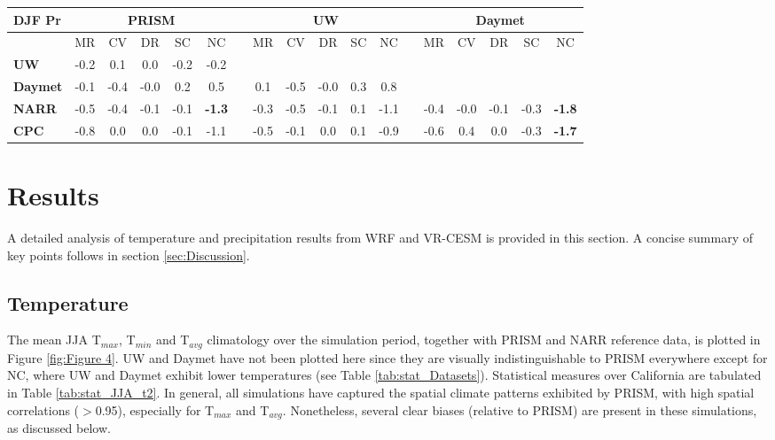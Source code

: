 \begin{table}
\begin{tabular}{lccccccccccccccccc}
\hline \hline \textbf{DJF Pr} & \multicolumn{5}{c}{\textbf{PRISM}} & & \multicolumn{5}{c}{\textbf{UW}} & & \multicolumn{5}{c}{\textbf{Daymet}} \\
\hline & MR &CV& DR& SC& NC & & MR& CV &DR &SC& NC & & MR &CV &DR &SC& NC \\
\hline \textbf{UW} & -0.2 & 0.1 & 0.0 & -0.2 & -0.2 \\
\textbf{Daymet} & -0.1 & -0.4 & -0.0 & 0.2 & 0.5 & & 0.1 & -0.5 & -0.0 & 0.3 & 0.8 \\
\textbf{NARR} & -0.5 & -0.4 & -0.1 & -0.1 &\textbf{\color{pinkred}-1.3} & & -0.3 & -0.5 & -0.1 & 0.1 & -1.1 & & -0.4 & -0.0 & -0.1 & -0.3 & \textbf{\color{pinkred}-1.8} \\ 
\textbf{CPC} & -0.8 & 0.0 & 0.0 & -0.1 & -1.1 & & -0.5 & -0.1 & 0.0 & 0.1 & -0.9 & & -0.6 & 0.4 & 0.0 & -0.3 & \textbf{\color{pinkred}-1.7} \\
\hline
\end{tabular}
\end{table}

\section{Results}

A detailed analysis of temperature and precipitation results from WRF and VR-CESM is provided in this section.  A concise summary of key points follows in section \ref{sec:Discussion}.

\subsection{Temperature}

The mean JJA T$_{max}$, T$_{min}$ and T$_{avg}$ climatology over the simulation period, together with PRISM and NARR reference data, is plotted in Figure \ref{fig:Figure 4}. UW and Daymet have not been plotted here since they are visually indistinguishable to PRISM everywhere except for NC, where UW and Daymet exhibit lower temperatures (see Table \ref{tab:stat_Datasets}).  Statistical measures over California are tabulated in Table \ref{tab:stat_JJA_t2}. In general, all simulations have captured the spatial climate patterns exhibited by PRISM, with high spatial correlations ($>$0.95), especially for T$_{max}$ and T$_{avg}$.  Nonetheless, several clear biases (relative to PRISM) are present in these simulations, as discussed below.

